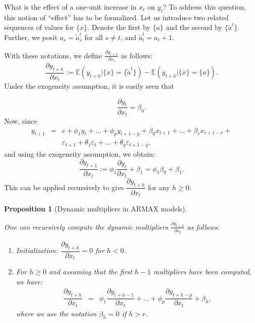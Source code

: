 \documentclass[
  12pt,
]{book}
\providecommand{\tightlist}{%
  \setlength{\itemsep}{0pt}\setlength{\parskip}{0pt}}
\newtheorem{proposition}{Proposition}[chapter]
\theoremstyle{definition}
\theoremstyle{definition}
\theoremstyle{definition}
\theoremstyle{definition}
\theoremstyle{remark}
\begin{document}
What is the effect of a one-unit increase in \(x_t\) on \(y_t\)? To address this question, this notion of ``effect'' has to be formalized. Let us introduce two related sequences of values for \(\{x\}\). Denote the first by \(\{a\}\) and the second by \(\{\tilde{a}^t\}\). Further, we posit \(a_s = \tilde{a}_s^t\) for all \(s \ne t\), and \(\tilde{a}_t^t = a_t+1\).

With these notations, we define \(\frac{\partial y_{t+h}}{\partial x_t}\) as follows:
\begin{equation}
\frac{\partial y_{t+h}}{\partial x_t} := \mathbb{E}(y_{t+h}|\{x\} = \{\tilde{a}^t\}) - \mathbb{E}(y_{t+h}|\{x\} = \{a\}).\label{eq:dynmultX}
\end{equation}
Under the exogeneity assumption, it is easily seen that

\[
\frac{\partial y_t}{\partial x_t} = \beta_0.
\]
Now, since
\begin{eqnarray*}
y_{t+1} &=& c + \phi_1 y_{t} + \dots + \phi_p y_{t+1-p} + \beta_0 x_{t+1} + \dots + \beta_{r} x_{t+1-r} +\\
&&\varepsilon_{t+1} + \theta_1\varepsilon_{t}+\dots +\theta_{q}\varepsilon_{t+1-q},
\end{eqnarray*}
and using the exogeneity assumption, we obtain:
\[
\frac{\partial y_{t+1}}{\partial x_t} := \phi_1 \frac{\partial y_{t}}{\partial x_t} + \beta_1 = \phi_1\beta_0 + \beta_1.
\]
This can be applied recursively to give \(\dfrac{\partial y_{t+h}}{\partial x_t}\) for any \(h \ge 0\):

\begin{proposition}[Dynamic multipliers in ARMAX models]
\protect\hypertarget{prp:computPsiARMAX}{}\label{prp:computPsiARMAX}

One can recursively compute the dynamic multipliers \(\frac{\partial y_{t+h}}{\partial x_t}\) as follows:

\begin{enumerate}
\def\labelenumi{\roman{enumi}.}
\tightlist
\item
  Initialization: \(\dfrac{\partial y_{t+h}}{\partial x_t}=0\) for \(h<0\).
\item
  For \(h \ge 0\) and assuming that the first \(h-1\) multipliers have been computed, we have:
  \begin{eqnarray}
  \dfrac{\partial y_{t+h}}{\partial x_t} &=& \phi_1 \dfrac{\partial y_{t+h-1}}{\partial x_t} + \dots + \phi_p \dfrac{\partial y_{t+h-p}}{\partial x_t} + \beta_h,\label{eq:dynmultX}
  \end{eqnarray}
  where we use the notation \(\beta_h=0\) if \(h>r\).
\end{enumerate}

\end{proposition}
\end{document}
